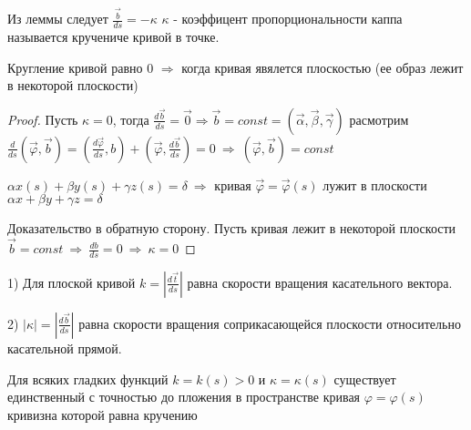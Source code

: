 \begin{block}[Следствие]
  Из леммы следует $\frac{\vec b}{ds} = - \kappa$ $\kappa$ - коэффицент
  пропорциональности каппа называется кручениче кривой в точке.
\end{block}

\begin{theorem}
  Кругление кривой равно 0 $\Rightarrow$ когда кривая явялется плоскостью
  (ее образ лежит в некоторой плоскости)
\end{theorem}

\begin{proof}
  Пусть $\kappa = 0$, тогда $\frac{d\vec b}{ds} = \vec 0 \Rightarrow \vec b =
  const = (\vec \alpha, \vec \beta, \vec \gamma)$ расмотрим
  $\frac{d}{ds}(\vec \varphi, \vec b) = (\frac{d \vec \varphi}{ds}, b) +
  (\vec \varphi, \frac{d\vec b}{ds}) = 0 ~ \Rightarrow ~
  (\vec \varphi, \vec b) = const$

  $\alpha x(s) + \beta y(s) + \gamma z(s) = \delta ~ \Rightarrow$ кривая
  $\vec \varphi = \vec \varphi (s)$ лужит в плоскости $\alpha x + \beta y +
  \gamma z = \delta$

  Доказательство в обратную сторону. Пусть кривая лежит в некоторой плоскости
  $\vec b = const ~ \Rightarrow ~ \frac{db}{ds} = 0 ~ \Rightarrow ~ \kappa = 0$
\end{proof}

\begin{theorem}
  1) Для плоской кривой $k = |\frac{d \vec t}{ds}|$ равна скорости вращения
  касательного вектора.

  2) $|\kappa| = |\frac{d\vec b}{ds}|$ равна скорости вращения соприкасающейся
  плоскости относительно касательной прямой.
\end{theorem}

\begin{theorem}
  Для всяких гладких функций $k = k(s) > 0$ и $\kappa = \kappa(s)$ существует
  единственный с точностью до пложения в пространстве кривая
  $\varphi = \varphi(s)$ кривизна которой равна кручению
\end{theorem}